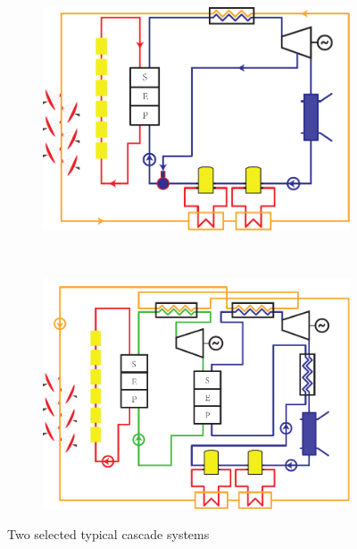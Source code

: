 \noindent \begin{figure}[htbp]
\centering
	\begin{subfigure}[b]{0.4\columnwidth}
	\includegraphics[width = \columnwidth]{fig/CascadeSystem1}
	\caption{}\label{fig:CascadeSystem1}
	\end{subfigure}
	~
\begin{subfigure}[b]{0.4\columnwidth}
	\includegraphics[width = \columnwidth]{fig/CascadeSystem2}
	\caption{}\label{fig:CascadeSystem2}
	\end{subfigure}
	\caption{Two selected typical cascade systems}
	\label{fig:CascadeSystems}
\end{figure}

